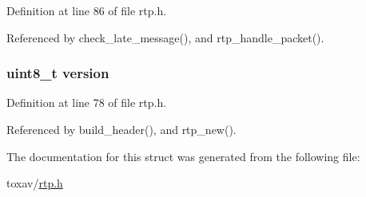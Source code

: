 Definition at line 86 of file rtp.\+h.



Referenced by check\+\_\+late\+\_\+message(), and rtp\+\_\+handle\+\_\+packet().

\hypertarget{struct___r_t_p_session_ab22abc2906422da61885ac6c8e6a1a59}{
\subsubsection[{version}]{\setlength{\rightskip}{0pt plus 5cm}uint8\+\_\+t version}}\label{struct___r_t_p_session_ab22abc2906422da61885ac6c8e6a1a59}


Definition at line 78 of file rtp.\+h.



Referenced by build\+\_\+header(), and rtp\+\_\+new().



The documentation for this struct was generated from the following file\+:\begin{DoxyCompactItemize}
\item 
toxav/\hyperlink{rtp_8h}{rtp.\+h}\end{DoxyCompactItemize}
